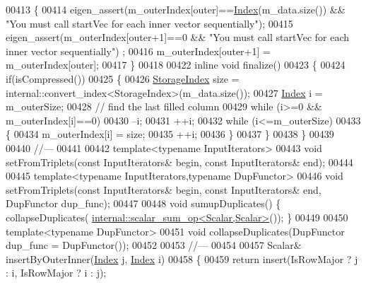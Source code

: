 \begin{DoxyCode}
00413     \{
00414       eigen\_assert(m\_outerIndex[outer]==\hyperlink{namespace_eigen_a62e77e0933482dafde8fe197d9a2cfde}{Index}(m\_data.size()) && \textcolor{stringliteral}{"You must call startVec for each inner
       vector sequentially"});
00415       eigen\_assert(m\_outerIndex[outer+1]==0 && \textcolor{stringliteral}{"You must call startVec for each inner vector sequentially"})
      ;
00416       m\_outerIndex[outer+1] = m\_outerIndex[outer];
00417     \}
00418 
00422     \textcolor{keyword}{inline} \textcolor{keywordtype}{void} finalize()
00423     \{
00424       \textcolor{keywordflow}{if}(isCompressed())
00425       \{
00426         \hyperlink{group___sparse_core___module_a0b540ba724726ebe953f8c0df06081ed}{StorageIndex} size = internal::convert\_index<StorageIndex>(m\_data.size());
00427         \hyperlink{group___core___module_a554f30542cc2316add4b1ea0a492ff02}{Index} i = m\_outerSize;
00428         \textcolor{comment}{// find the last filled column}
00429         \textcolor{keywordflow}{while} (i>=0 && m\_outerIndex[i]==0)
00430           --i;
00431         ++i;
00432         \textcolor{keywordflow}{while} (i<=m\_outerSize)
00433         \{
00434           m\_outerIndex[i] = size;
00435           ++i;
00436         \}
00437       \}
00438     \}
00439 
00440     \textcolor{comment}{//---}
00441 
00442     \textcolor{keyword}{template}<\textcolor{keyword}{typename} InputIterators>
00443     \textcolor{keywordtype}{void} setFromTriplets(\textcolor{keyword}{const} InputIterators& begin, \textcolor{keyword}{const} InputIterators& end);
00444 
00445     \textcolor{keyword}{template}<\textcolor{keyword}{typename} InputIterators,\textcolor{keyword}{typename} DupFunctor>
00446     \textcolor{keywordtype}{void} setFromTriplets(\textcolor{keyword}{const} InputIterators& begin, \textcolor{keyword}{const} InputIterators& end, DupFunctor dup\_func);
00447 
00448     \textcolor{keywordtype}{void} sumupDuplicates() \{ collapseDuplicates(
      \hyperlink{struct_eigen_1_1internal_1_1scalar__sum__op}{internal::scalar\_sum\_op<Scalar,Scalar>}()); \}
00449 
00450     \textcolor{keyword}{template}<\textcolor{keyword}{typename} DupFunctor>
00451     \textcolor{keywordtype}{void} collapseDuplicates(DupFunctor dup\_func = DupFunctor());
00452 
00453     \textcolor{comment}{//---}
00454     
00457     Scalar& insertByOuterInner(\hyperlink{group___core___module_a554f30542cc2316add4b1ea0a492ff02}{Index} j, \hyperlink{group___core___module_a554f30542cc2316add4b1ea0a492ff02}{Index} i)
00458     \{
00459       \textcolor{keywordflow}{return} insert(IsRowMajor ? j : i, IsRowMajor ? i : j);

\end{DoxyCode}
